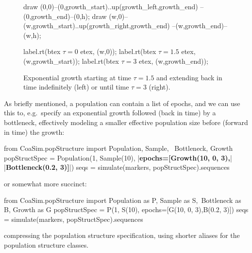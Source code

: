 \documentclass{manual}
\begin{document}
\begin{empfile}
\begin{figure}[t]
\begin{empdef}
    draw (0,0)--(0,growth_start)..{up}(growth_left,growth_end)
         --(0,growth_end)--(0,h);
    draw (w,0)--(w,growth_start)..{up}(growth_right,growth_end)
         --(w,growth_end)--(w,h);
  
    label.rt(btex $\tau=0$ etex,   (w,0));
    label.rt(btex $\tau=1.5$ etex, (w,growth_start));
    label.rt(btex $\tau=3$ etex,   (w,growth_end));
  \end{empdef}
  
  \hspace*{.5cm}
  \hfill
  \hspace*{.5cm}

  \caption{Exponential growth starting at time $\tau=1.5$ and
    extending back in time indefinitely (left) or until time $\tau=3$
    (right).}
  \label{fig:growth}
\end{figure}

As briefly mentioned, a population can contain a list of epochs, and
we can use this to, e.g.\ specify an exponential growth followed (back
in time) by a bottleneck, effectively modeling a smaller effective
population size before (forward in time) the growth:
\begin{code}
from CoaSim.popStructure import Population, Sample, \
                                Bottleneck, Growth
popStructSpec = Population(1, Sample(10), 
                           |\textbf{epochs=[Growth(10, 0, 3),}|
                                   |\textbf{Bottleneck(0.2, 3)]}|)
seqs = simulate(markers, popStructSpec).sequences
\end{code}
or somewhat more succinct:
\begin{code}
from CoaSim.popStructure import Population as P, Sample as S,\
                                Bottleneck as B, Growth as G
popStructSpec = P(1, S(10), epochs=[G(10, 0, 3),B(0.2, 3)])
seqs = simulate(markers, popStructSpec).sequences
\end{code}
compressing the population structure specification, using shorter
aliases for the population structure classes.


\end{empfile}
\end{document}
